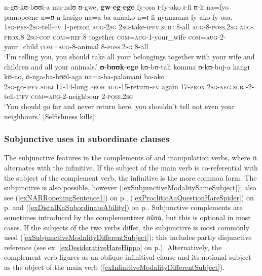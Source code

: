 \begin{exe}
\ex  \label{exSUBJegeRecommendation}
\gll n-gʊ-kʊ-bʊʊl-a mu-ndʊ ʊ-gwe, \textbf{gw}-\textbf{eg}-\textbf{ege} fy-osa ɪ-fy-ako ɪ-fi ʊ-lɪ na=fyo pamopeene n=ʊ-n-kasigo na=a-ba-anaako n=ɪ-fi-nyamaana fy-ako fy-osa.\\
\textsc{1sg}-\textsc{prs}-\textsc{2sg}-tell-\textsc{fv} 1-person \textsc{aug}-\textsc{2sg} \textsc{2sg}-take-\textsc{ipfv.subj} 8-all \textsc{aug}-8-\textsc{poss.2sg} \textsc{aug}-\textsc{prox.8} \textsc{2sg}-\textsc{cop} \textsc{com}=\textsc{ref.8} together \textsc{com}=\textsc{aug}-1-your\_wife \textsc{com}=\textsc{aug}-2-your\_child \textsc{com}=\textsc{aug}-8-animal 8-\textsc{poss.2sg} 8-all\\
\glt `I'm telling you, you should take all your belongings together with your wife and children and all your animals.'
\sn \gll \textbf{ʊ}-\textbf{bʊʊk}-\textbf{ege} kʊ-bʊ-tali komma ʊ-kʊ-buj-a kangɪ kʊ-no, ʊ-nga-ba-bʊʊl-aga na=a-ba-palamani ba-ako\\
\textsc{2sg}-go-\textsc{ipfv.subj} 17-14-long \textsc{proh} \textsc{aug}-15-return-\textsc{fv} again 17-\textsc{prox} \textsc{2sg}-\textsc{neg.subj}-2-tell-\textsc{ipfv} \textsc{com}=\textsc{aug}-2-neighbour 2-\textsc{poss.2sg}\\
\glt  \lq You should go far and never return here, you shouldn't tell not even your neighbours.' [Selfishness kills]
\end{exe}

\subsubsection{Subjunctive uses in subordinate clauses}\label{SubjunctiveSubordinate}
The subjunctive features in the complements of  and manipulation verbs, where it alternates with the infinitive. If the subject of the main verb is co-referential with the subject of the complement verb, the infinitive is the more common form. The subjunctive is also possible, however (\ref{exSubjunctiveModalitySameSubject}); also see 
(\ref{exNARRopeningSentence1}) on p.\nobreakspace\pageref{exNARRopeningSentence1}, (\ref{exProcliticAaQuestionHareSpider}) on p.\nobreakspace\pageref{exProcliticAaQuestionHareSpider} and
(\ref{exDistalKaSubordinateAbility}) on p.\nobreakspace\pageref{exDistalKaSubordinateAbility}. Subjunctive complements are sometimes introduced by the complementizer \textit{ʊkʊtɪ}, but this is optional in most cases. If the subjects of the two verbs differ, the subjunctive is most commonly used (\ref{exSubjunctiveModalityDifferentSubject}); this includes partly disjunctive reference (see ex. \ref{exDesiderativeHareHippo} on p.\nobreakspace\pageref{exDesiderativeHareHippo}). Alternatively, the complement verb figures as an oblique infinitival clause and its notional subject as the object of the main verb (\ref{exInfinitiveModalityDifferentSubject}).

